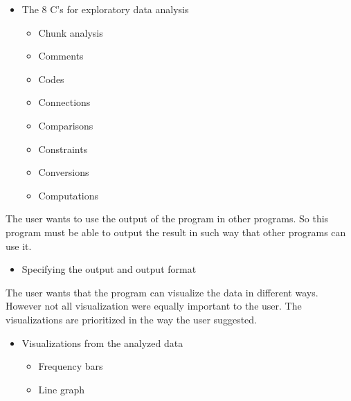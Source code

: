 \begin{itemize}
  \item The 8 C's for exploratory data analysis
  \begin{itemize}
    \item Chunk analysis
    \item Comments
    \item Codes 
    \item Connections
    \item Comparisons
    \item Constraints
    \item Conversions
    \item Computations
  \end{itemize}
    \end{itemize}
The user wants to use the output of the program in other programs. So this program must be able to output the result in such way that other programs can use it.
  \begin{itemize}
  \item Specifying the output and output format
\end{itemize}
The user wants that the program can visualize the data in different ways. However not all visualization were equally important to the user. The visualizations are prioritized in the way the user suggested.
\begin{itemize}
  \item Visualizations from the analyzed data
  \begin{itemize}
  	\item Frequency bars
    \item Line graph
  \end{itemize}
\end{itemize}

